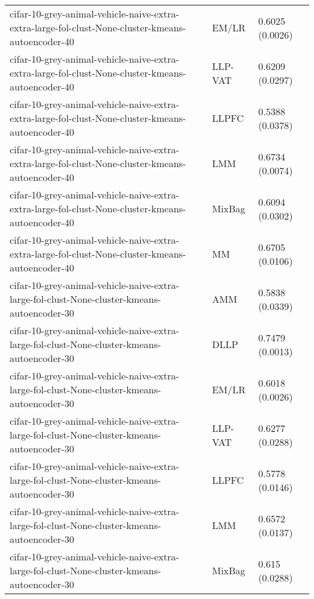\begin{longtable}{lll}
            cifar-10-grey-animal-vehicle-naive-extra-extra-large-fol-clust-None-cluster-kmeans-autoencoder-40 &     EM/LR &                           0.6025 (0.0026) \\
            cifar-10-grey-animal-vehicle-naive-extra-extra-large-fol-clust-None-cluster-kmeans-autoencoder-40 &   LLP-VAT &                           0.6209 (0.0297) \\
            cifar-10-grey-animal-vehicle-naive-extra-extra-large-fol-clust-None-cluster-kmeans-autoencoder-40 &     LLPFC &                           0.5388 (0.0378) \\
            cifar-10-grey-animal-vehicle-naive-extra-extra-large-fol-clust-None-cluster-kmeans-autoencoder-40 &       LMM &                           0.6734 (0.0074) \\
            cifar-10-grey-animal-vehicle-naive-extra-extra-large-fol-clust-None-cluster-kmeans-autoencoder-40 &    MixBag &                           0.6094 (0.0302) \\
            cifar-10-grey-animal-vehicle-naive-extra-extra-large-fol-clust-None-cluster-kmeans-autoencoder-40 &        MM &                           0.6705 (0.0106) \\
                  cifar-10-grey-animal-vehicle-naive-extra-large-fol-clust-None-cluster-kmeans-autoencoder-30 &       AMM &                           0.5838 (0.0339) \\
                  cifar-10-grey-animal-vehicle-naive-extra-large-fol-clust-None-cluster-kmeans-autoencoder-30 &      DLLP &                           0.7479 (0.0013) \\
                  cifar-10-grey-animal-vehicle-naive-extra-large-fol-clust-None-cluster-kmeans-autoencoder-30 &     EM/LR &                           0.6018 (0.0026) \\
                  cifar-10-grey-animal-vehicle-naive-extra-large-fol-clust-None-cluster-kmeans-autoencoder-30 &   LLP-VAT &                           0.6277 (0.0288) \\
                  cifar-10-grey-animal-vehicle-naive-extra-large-fol-clust-None-cluster-kmeans-autoencoder-30 &     LLPFC &                           0.5778 (0.0146) \\
                  cifar-10-grey-animal-vehicle-naive-extra-large-fol-clust-None-cluster-kmeans-autoencoder-30 &       LMM &                           0.6572 (0.0137) \\
                  cifar-10-grey-animal-vehicle-naive-extra-large-fol-clust-None-cluster-kmeans-autoencoder-30 &    MixBag &                            0.615 (0.0288) \\

\end{longtable}
